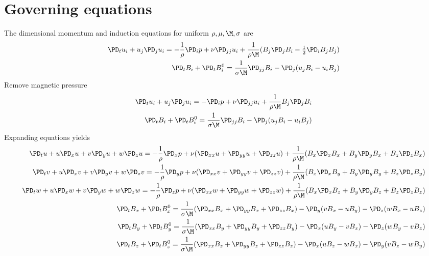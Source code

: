 \documentclass[11pt]{article}
\begin{document}
\doublespacing
\MOONSTITLE
\maketitle

\section{Governing equations}
The dimensional momentum and induction equations for uniform $\rho,\mu,\M,\sigma$ are
\begin{equation}\begin{aligned}
\PD_t u_i+u_j\PD_j u_i = - \frac{1}{\rho} \PD_i p+ \nu \PD_{jj} u_i + \frac{1}{\rho \M} (B_j \PD_j B_i - \tfrac{1}{2} \PD_i B_j B_j) \\
\PD_t B_i + \PD_t B_i^0 = \frac{1}{\sigma \M} \PD_{jj} B_i - \PD_j (u_j B_i - u_i B_j)
\end{aligned} \end{equation}
Remove magnetic pressure
\begin{equation}\begin{aligned}
\PD_t u_i+u_j\PD_j u_i = -\PD_i p+ \nu \PD_{jj} u_i + \frac{1}{\rho \M} B_j \PD_j B_i \\
\PD_t B_i + \PD_t B_i^0 = \frac{1}{\sigma \M} \PD_{jj} B_i - \PD_j (u_j B_i - u_i B_j)
\end{aligned} \end{equation}
Expanding equations yields
\begin{equation}\begin{aligned}
\PD_t u+ u\PD_x u + v\PD_y u + w\PD_z u = -\frac{1}{\rho}\PD_x p+ \nu (\PD_{xx} u+\PD_{yy} u+\PD_{zz} u) + \frac{1}{\rho \M} (B_x \PD_x B_x + B_y \PD_y B_x + B_z \PD_z B_x) \\
\PD_t v+ u\PD_x v + v\PD_y v + w\PD_z v = -\frac{1}{\rho}\PD_y p+ \nu (\PD_{xx} v+\PD_{yy} v+\PD_{zz} v) + \frac{1}{\rho \M} (B_x \PD_x B_y + B_y \PD_y B_y + B_z \PD_z B_y) \\
\PD_t w+ u\PD_x w + v\PD_y w + w\PD_z w = -\frac{1}{\rho}\PD_z p+ \nu (\PD_{xx} w+\PD_{yy} w+\PD_{zz} w) + \frac{1}{\rho \M} (B_x \PD_x B_z + B_y \PD_y B_z + B_z \PD_z B_z) \\
\PD_t B_x + \PD_t B_x^0 = \frac{1}{\sigma \M} (\PD_{xx} B_x + \PD_{yy} B_x+\PD_{zz} B_x)                         - \PD_y (v B_x - u B_y) - \PD_z (w B_x - u B_z) \\
\PD_t B_y + \PD_t B_y^0 = \frac{1}{\sigma \M} (\PD_{xx} B_y + \PD_{yy} B_y+\PD_{zz} B_y) - \PD_x (u B_y - v B_x)                         - \PD_z (w B_y - v B_z) \\
\PD_t B_z + \PD_t B_z^0 = \frac{1}{\sigma \M} (\PD_{xx} B_z + \PD_{yy} B_z+\PD_{zz} B_z) - \PD_x (u B_z - w B_x) - \PD_y (v B_z - w B_y)                         \\
\end{aligned} \end{equation}
\end{document}
